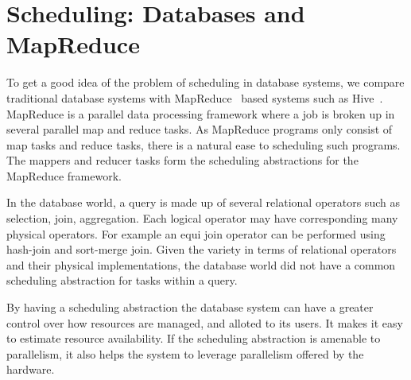 \section{Scheduling: Databases and MapReduce}
To get a good idea of the problem of scheduling in database systems, we compare traditional database systems with MapReduce~\cite{mapreduce} based systems such as Hive~\cite{thusoo2010hive}.
MapReduce is a parallel data processing framework where a job is broken up in several parallel map and reduce tasks. 
As MapReduce programs only consist of map tasks and reduce tasks, there is a natural ease to scheduling such programs.
The mappers and reducer tasks form the scheduling abstractions for the MapReduce framework.

In the database world, a query is made up of several relational operators such as selection, join, aggregation. 
Each logical operator may have corresponding many physical operators. 
For example an equi join operator can be performed using hash-join and sort-merge join.
Given the variety in terms of relational operators and their physical implementations, the database world did not have a common scheduling abstraction for tasks within a query. 

By having a scheduling abstraction the database system can have a greater control over how resources are managed, and alloted to its users.
It makes it easy to estimate resource availability.
If the scheduling abstraction is amenable to parallelism, it also helps the system to leverage parallelism offered by the hardware. 

